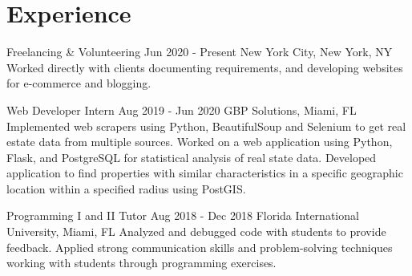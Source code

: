 \documentclass[letterpaper,10pt]{article}
\begin{document}
\section{Experience}
\sectionStart

  \jobHeading
    {Freelancing \& Volunteering}
    {Jun 2020 - Present}
    {New York City, New York, NY}
  \listStart
    \bulletItem
    {Worked directly with clients documenting requirements, and developing websites for e-commerce and blogging.}
  \listEnd

  \jobHeading
    {Web Developer Intern}
    {Aug 2019 - Jun 2020}
    {GBP Solutions, Miami, FL}
  \listStart
    \bulletItem
    {Implemented web scrapers using Python, BeautifulSoup and Selenium to get real estate data from multiple sources.}
    \bulletItem
    {Worked on a web application using Python, Flask, and PostgreSQL for statistical analysis of real state data.}
    \bulletItem
    {Developed application to find properties with similar characteristics in a specific geographic location within a specified radius using PostGIS.}
  \listEnd

  \jobHeading
    {Programming I and II Tutor}
    {Aug 2018 - Dec 2018}
    {Florida International University, Miami, FL}
  \listStart
    \bulletItem
    {Analyzed and debugged code with students to provide feedback.}
    \bulletItem
    {Applied strong communication skills and problem-solving techniques working with students through programming exercises.}
  \listEnd

\sectionEnd

\end{document}
